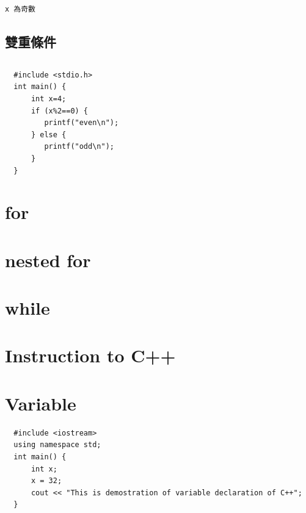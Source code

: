 \documentclass[12pt,a4paper]{article}
\begin{document}
\begin{verbatim}
x 為奇數
\end{verbatim}

\subsection{雙重條件}
\label{sec:org548f87f}

\subsection{}
\label{sec:org51e0942}
\lstset{breaklines=true,language=C,label= ,caption= ,captionpos=b,numbers=none}
\begin{lstlisting}
  #include <stdio.h>
  int main() {
      int x=4;
      if (x%2==0) {
         printf("even\n");
      } else {
	     printf("odd\n");
      }
  }
\end{lstlisting}

\section{for}
\label{sec:orgdb7b9ab}

\section{nested for}
\label{sec:org0f31216}

\section{while}
\label{sec:orgacdf5ab}

\section{Instruction to C++}
\label{sec:org3d17a5b}

\section{Variable}
\label{sec:org21cbc94}

\lstset{breaklines=true,language=C++,label= ,caption= ,captionpos=b,firstnumber=1,numbers=left}
\begin{lstlisting}
  #include <iostream>
  using namespace std;
  int main() {
      int x;
      x = 32;
      cout << "This is demostration of variable declaration of C++";
  }

\end{lstlisting}
\end{document}

